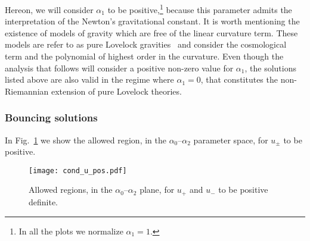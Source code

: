 \documentclass[aps,prd,12pt,superscriptaddress,showpacs,showkeys,longbibliography,reprint,nofootinbib]{revtex4-1}
\begin{document}
Hereon, we will consider $\alpha_1$ to be positive,\footnote{In all the plots we normalize $\alpha_1 = 1$.} because this parameter admits the interpretation of the Newton's gravitational constant. It is worth mentioning the existence of models of gravity which are free of the linear curvature term. These models are refer to as pure Lovelock gravities~\cite{Cai:2006pq} and consider the cosmological term and the polynomial of highest order in the curvature. Even though the analysis that follows will consider a positive non-zero value for $\alpha_1$, the solutions listed above are also valid in the regime where $\alpha_1=0$, that constitutes the non-Riemannian extension of pure Lovelock theories.

\subsubsection{Bouncing solutions}

In Fig.~\ref{cond_u_pos} we show the allowed region, in the $\alpha_0$--$\alpha_2$ parameter space, for $u_\pm$ to be positive. 

\begin{figure}[H]
  \texttt{[image: cond\_u\_pos.pdf]}
  \caption{Allowed regions, in the $\alpha_0$--$\alpha_2$ plane, for $u_+$ and $u_-$ to be positive definite.}
  \label{cond_u_pos}
\end{figure}
\end{document}
